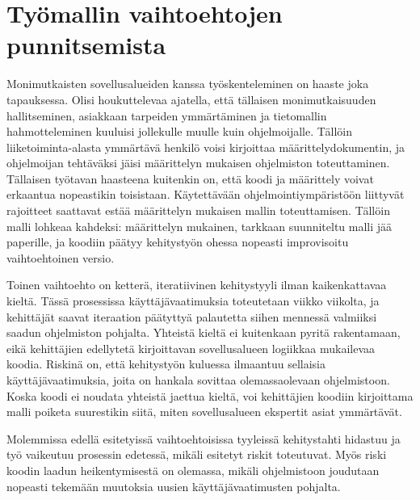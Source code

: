 \hypertarget{tyuxf6mallin-vaihtoehtojen-punnitsemista}{%
\section{Työmallin vaihtoehtojen
punnitsemista}\label{tyuxf6mallin-vaihtoehtojen-punnitsemista}}

Monimutkaisten sovellusalueiden kanssa työskenteleminen on haaste joka
tapauksessa. Olisi houkuttelevaa ajatella, että tällaisen
monimutkaisuuden hallitseminen, asiakkaan tarpeiden ymmärtäminen ja
tietomallin hahmotteleminen kuuluisi jollekulle muulle kuin
ohjelmoijalle. Tällöin liiketoiminta-alasta ymmärtävä henkilö voisi
kirjoittaa määrittelydokumentin, ja ohjelmoijan tehtäväksi jäisi
määrittelyn mukaisen ohjelmiston toteuttaminen. Tällaisen työtavan
haasteena kuitenkin on, että koodi ja määrittely voivat erkaantua
nopeastikin toisistaan. Käytettävään ohjelmointiympäristöön liittyvät
rajoitteet saattavat estää määrittelyn mukaisen mallin toteuttamisen.
Tällöin malli lohkeaa kahdeksi: määrittelyn mukainen, tarkkaan
suunniteltu malli jää paperille, ja koodiin päätyy kehitystyön ohessa
nopeasti improvisoitu vaihtoehtoinen versio. \cite{evans:ddd}

Toinen vaihtoehto on ketterä, iteratiivinen kehitystyyli ilman
kaikenkattavaa kieltä. Tässä prosessissa käyttäjävaatimuksia toteutetaan
viikko viikolta, ja kehittäjät saavat iteraation päätyttyä palautetta
siihen mennessä valmiiksi saadun ohjelmiston pohjalta. Yhteistä kieltä
ei kuitenkaan pyritä rakentamaan, eikä kehittäjien edellytetä
kirjoittavan sovellusalueen logiikkaa mukailevaa koodia. Riskinä on,
että kehitystyön kuluessa ilmaantuu sellaisia käyttäjävaatimuksia, joita
on hankala sovittaa olemassaolevaan ohjelmistoon. Koska koodi ei noudata
yhteistä jaettua kieltä, voi kehittäjien koodiin kirjoittama malli
poiketa suurestikin siitä, miten sovellusalueen ekspertit asiat
ymmärtävät. \cite{evans:ddd}

Molemmissa edellä esitetyissä vaihtoehtoisissa tyyleissä kehitystahti
hidastuu ja työ vaikeutuu prosessin edetessä, mikäli esitetyt riskit
toteutuvat. Myös riski koodin laadun heikentymisestä on olemassa, mikäli
ohjelmistoon joudutaan nopeasti tekemään muutoksia uusien
käyttäjävaatimusten pohjalta.
